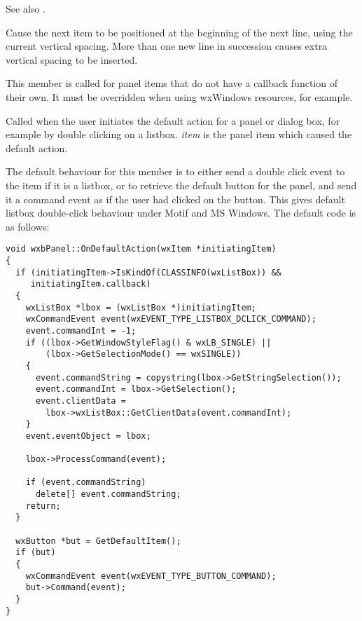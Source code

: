 See also .



Cause the next item to be positioned at the beginning of the next line,
using the current vertical spacing. More than one new line in succession
causes extra vertical spacing to be inserted.

\label{wxpaneloncommand}


This member is called for panel items that do not have a callback function
of their own. It must be overridden when using wxWindows resources, for example.


\label{wxpanelondefaultaction}


Called when the user initiates the default action for a panel or
dialog box, for example by double clicking on a listbox. {\it item}
is the panel item which caused the default action.

The default behaviour for this member is to either send a double click
event to the item if it is a listbox, or to retrieve the default button
for the panel, and send it a command event as if the user had clicked
on the button. This gives default listbox double-click behaviour under
Motif and MS Windows. The default code is as follows:

{\small
\begin{verbatim}
void wxbPanel::OnDefaultAction(wxItem *initiatingItem)
{
  if (initiatingItem->IsKindOf(CLASSINFO(wxListBox)) &&
     initiatingItem.callback)
  {
    wxListBox *lbox = (wxListBox *)initiatingItem;
    wxCommandEvent event(wxEVENT_TYPE_LISTBOX_DCLICK_COMMAND);
    event.commandInt = -1;
    if ((lbox->GetWindowStyleFlag() & wxLB_SINGLE) ||
        (lbox->GetSelectionMode() == wxSINGLE))
    {
      event.commandString = copystring(lbox->GetStringSelection());
      event.commandInt = lbox->GetSelection();
      event.clientData =
        lbox->wxListBox::GetClientData(event.commandInt);
    }
    event.eventObject = lbox;

    lbox->ProcessCommand(event);

    if (event.commandString)
      delete[] event.commandString;
    return;
  }
  
  wxButton *but = GetDefaultItem();
  if (but)
  {
    wxCommandEvent event(wxEVENT_TYPE_BUTTON_COMMAND);
    but->Command(event);
  }
}
\end{verbatim}
}

